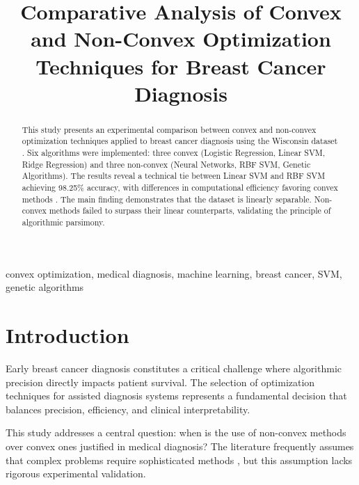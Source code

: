 \documentclass[conference]{IEEEtran}
\begin{document}
\title{Comparative Analysis of Convex and Non-Convex Optimization Techniques for Breast Cancer Diagnosis}

\author{
}

\maketitle

\begin{abstract}
This study presents an experimental comparison between convex and non-convex optimization techniques applied to breast cancer diagnosis using the Wisconsin dataset \cite{wolberg1995}. Six algorithms were implemented: three convex (Logistic Regression, Linear SVM, Ridge Regression) and three non-convex (Neural Networks, RBF SVM, Genetic Algorithms). The results reveal a technical tie between Linear SVM and RBF SVM achieving 98.25\% accuracy, with differences in computational efficiency favoring convex methods \cite{boyd2004}. The main finding demonstrates that the dataset is linearly separable. Non-convex methods failed to surpass their linear counterparts, validating the principle of algorithmic parsimony.
\end{abstract}

\begin{IEEEkeywords}
convex optimization, medical diagnosis, machine learning, breast cancer, SVM, genetic algorithms
\end{IEEEkeywords}

\section{Introduction}

Early breast cancer diagnosis constitutes a critical challenge where algorithmic precision directly impacts patient survival. The selection of optimization techniques for assisted diagnosis systems represents a fundamental decision that balances precision, efficiency, and clinical interpretability.

This study addresses a central question: when is the use of non-convex methods over convex ones justified in medical diagnosis? The literature frequently assumes that complex problems require sophisticated methods \cite{hastie2009}, but this assumption lacks rigorous experimental validation.
\end{document}
